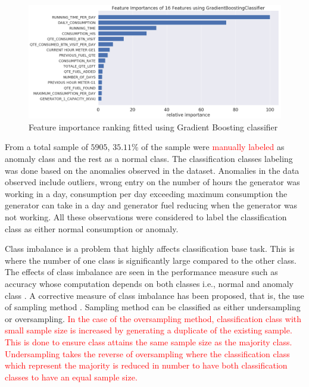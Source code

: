 \documentclass[a4paper,fleqn]{cas-dc}
\newcommand\mycorrections[1]{\textcolor{red}{#1}}
\begin{document}
\begin{figure}
		\begin{minipage}[H]{\linewidth}
	\centering
	\includegraphics[width=1.1\textwidth]{Figures/Feature_importance.png} 
		\end{minipage}
	\caption{Feature importance ranking fitted using Gradient Boosting classifier }
	\label{fig:feature}
	
\end{figure} 
From a total sample of $5905$, $35.11$\%  of the sample were \mycorrections{ manually labeled} as anomaly class and the rest as a normal class. The classification classes labeling was done based on the anomalies observed in the dataset.  Anomalies in the data observed include outliers, wrong entry on the number of hours the generator was working in a day, consumption per day exceeding maximum consumption the generator can take in a day and generator fuel reducing when the generator was not working. All these observations were considered to label the classification class as either normal consumption or anomaly. 

Class imbalance is a problem that highly affects classification base task. This is where the number of one class is significantly large compared to the other class. The effects of class imbalance are seen in the performance measure such as accuracy whose computation depends on both classes i.e., normal and anomaly class \cite{awoyemi2017credit}. A corrective measure of class imbalance has been proposed, that is, the use of sampling method \cite{brownlee2016master}. Sampling method can be classified as either undersampling or oversampling. \mycorrections{In the case of the oversampling method, classification class with small sample size is increased by generating a duplicate of the existing sample. This is done to ensure class attains the same sample size as the majority class. Undersampling takes the reverse of oversampling where the classification class which represent the majority is reduced in number to have both classification classes to have an equal sample size.} 
\end{document}
